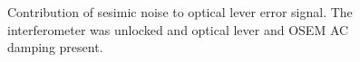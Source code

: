 \begin{figure}
\begin{centering}
\caption[]{Contribution of sesimic noise to optical lever error
  signal. The interferometer was unlocked and optical lever and OSEM
  AC damping present.}
\label{fig:}
\end{centering}
\end{figure}

